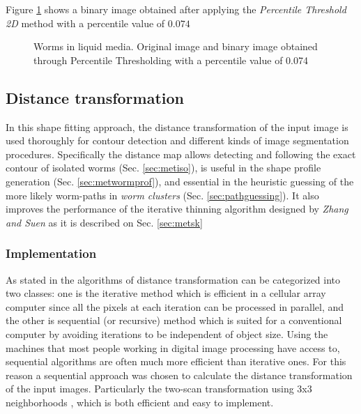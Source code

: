 Figure \ref{fig:wormthres} shows a binary image obtained after applying
the \emph{Percentile Threshold 2D} method with a percentile value of $0.074$

\begin{figure}[h t b p ! H]
  \centering
\qquad
\caption{Worms in liquid media. Original image and binary image obtained through
Percentile Thresholding with a percentile value of 0.074}
  \label{fig:wormthres}
\end{figure}

\subsection{Distance transformation}
\label{sec:metdt}

In this shape fitting approach, the distance transformation
of the input image is used thoroughly for contour detection and different kinds of image 
segmentation procedures. Specifically the distance map allows detecting and following
the exact contour of isolated worms (Sec. \ref{sec:metiso}), 
is useful in the shape profile generation (Sec. \ref{sec:metwormprof}), and essential in the heuristic
guessing of the more likely worm-paths in \emph{worm clusters} 
(Sec. \ref{sec:pathguessing}).
It also improves the performance of the iterative thinning algorithm designed by 
\emph{Zhang and Suen} \cite{thinning} as it is described on Sec. \ref{sec:metsk}

\subsubsection{Implementation}
\label{sec:dtimp}

 As stated in \cite[p.196]{fastdt} the algorithms of distance transformation can be categorized into two classes: one is the iterative 
 method which is efficient in a cellular array computer since all the pixels at each iteration can be processed in parallel, and the other 
is sequential (or recursive) method which is suited for a conventional computer by
 avoiding iterations to be independent of object size. 
Using the machines that most people working in digital image processing
 have access to, sequential algorithms are often much more efficient than
 iterative ones. For this reason a sequential approach was chosen to calculate the
distance transformation of the input images. Particularly the two-scan transformation
using 3x3 neighborhoods \cite{fastdt}, which is both efficient and easy to implement.\\

